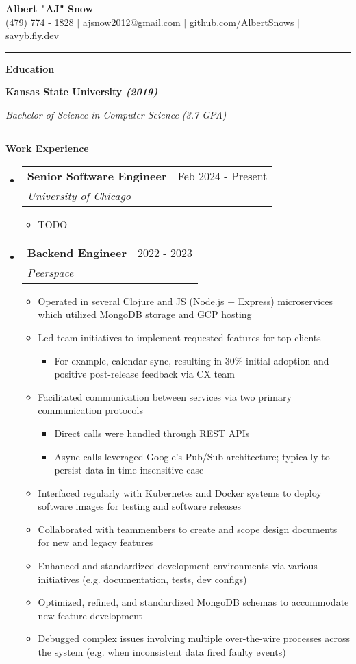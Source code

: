 \documentclass[letterpaper,11pt]{article}
\makeatletter
\newcommand{\resumeItem}[1]{
  \item\small{
    {#1 \vspace{-2pt}}
  }
}
\newcommand{\resumeSubheading}[4]{
  \vspace{-2pt}\item
    \begin{tabular*}{0.97\textwidth}[t]{l@{\extracolsep{\fill}}r}
      \textbf{#1} & #2 \\
      \textit{\small#3} & \textit{\small #4} \\
    \end{tabular*}\vspace{0pt}
}
\newcommand{\resumeSubHeadingListStart}{\begin{itemize}[leftmargin=0.15cm, label={}]}
\newcommand{\resumeSubHeadingListEnd}{\end{itemize}}
\newcommand{\resumeItemListStart}{\begin{itemize}}
\newcommand{\resumeItemListEnd}{\end{itemize}\vspace{-5pt}}
\makeatother
\begin{document}
\textbf{\normalshape \Large \textcolor{magic_blue}{Albert "AJ" Snow}} \\ \vspace{3pt}
\small (479) 774 - 1828 $|$ \href{mailto:ajsnow2012@gmail.com}
{\underline{ajsnow2012@gmail.com}} $|$
\href{https://github.com/AlbertSnows}{\underline{github.com/AlbertSnows}}
$|$ \href{https://savyb.fly.dev/}{\underline{savyb.fly.dev}}
\noindent\rule{19.5cm}{0.4pt}

\textbf{\large \textcolor{magic_blue}{Education}}

\begin{minipage}[t]{0.45\textwidth}
	\raggedright
	\textbf{ Kansas State University \textit{(2019)}} \\
\end{minipage}
\hfill
\begin{minipage}[t]{0.45\textwidth}
	\raggedleft
	\textit{Bachelor of Science in Computer Science (3.7 GPA)} \\
\end{minipage}
\noindent\rule{19.5cm}{0.4pt}

\textbf{\large \textcolor{magic_blue}{Work Experience}}

\resumeSubHeadingListStart
\resumeSubheading
{Senior Software Engineer}{Feb 2024 - Present}
{University of Chicago}{}
\resumeItemListStart
\resumeItem{ TODO }
\resumeItemListEnd
\resumeSubHeadingListEnd

\resumeSubHeadingListStart
\resumeSubheading
{Backend Engineer}{2022 - 2023}
{Peerspace}{}
\resumeItemListStart
\resumeItem{Operated in several Clojure and JS (Node.js + Express) microservices which utilized MongoDB storage and GCP hosting}
\resumeItem{ Led team initiatives to implement requested features for top clients }
\begin{itemize}
	\item For example, calendar sync, resulting in 30\% initial adoption and positive post-release feedback via CX team
\end{itemize}
\resumeItem{Facilitated communication between services via two primary communication protocols}
\begin{itemize}
	\item Direct calls were handled through REST APIs
	\item Async calls leveraged Google's Pub/Sub architecture; typically to persist data in time-insensitive case
\end{itemize}
\resumeItem{Interfaced regularly with Kubernetes and Docker systems to deploy software images for testing and software releases}
\resumeItem{Collaborated with teammembers to create and scope design documents for new and legacy features}
\resumeItem{Enhanced and standardized development environments via various initiatives (e.g. documentation, tests, dev configs)}
\resumeItem{Optimized, refined, and standardized MongoDB schemas to accommodate new feature development}
\resumeItem{Debugged complex issues involving multiple over-the-wire processes across the system (e.g. when inconsistent data fired faulty events) }
\resumeItemListEnd
\resumeSubHeadingListEnd
\end{document}
